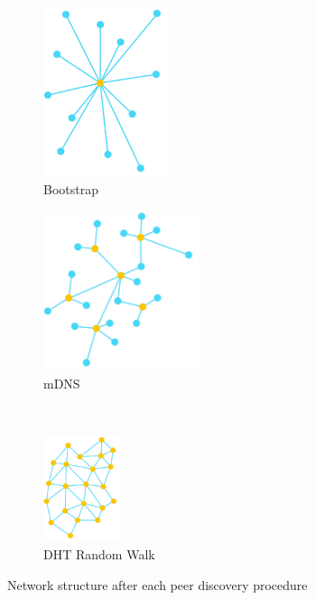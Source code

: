\begin{figure}[h]
    \centering
    \begin{subfigure}[t]{0.24\textwidth}
        \centering
        \includegraphics[width=0.4\textwidth,trim={0 0 0 0}]{figs/bootstrap_p2p.pdf}
        \centering
        \caption{Bootstrap}
    \end{subfigure}%
    \begin{subfigure}[t]{0.24\textwidth}
        \centering
        \includegraphics[width=0.5\textwidth,trim={0 0 0 0}]{figs/mdns_p2p.pdf}
        \centering
        \caption{mDNS}
    \end{subfigure}\\[1ex]
    \centering
    \begin{subfigure}[b]{0.4\textwidth}
        \centering
        \includegraphics[width=0.25\textwidth,trim={0 0 0 0}]{figs/dht_p2p.pdf}
        \centering
        \caption{DHT Random Walk}
    \end{subfigure}
    \caption{Network structure after each peer discovery procedure}
    \label{fig:peer_discovery}
\end{figure}

